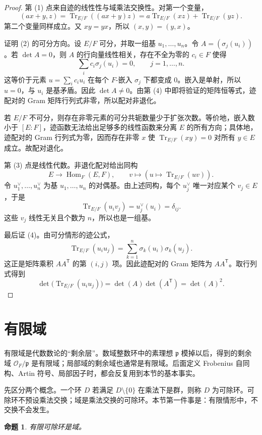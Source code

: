 \documentclass[11pt,a4paper,openany]{ctexbook}
\numberwithin{equation}{chapter}
\newcommand{\Tr}{\operatorname{Tr}}
\newcommand{\Hom}{\operatorname{Hom}}
\theoremstyle{plain}
\newtheorem{proposition}[theorem]{命题}
\theoremstyle{definition}
\theoremstyle{remark}
\begin{document}
\begin{proof}
第 (1) 点来自迹的线性性与域乘法交换性。对第一个变量，
\[
(ax+y,z)=\Tr_{E/F}((ax+y)z)
=a\Tr_{E/F}(xz)+\Tr_{E/F}(yz).
\]
第二个变量同样成立。又 $xy=yx$，所以 $(x,y)=(y,x)$。

证明 (2) 的可分方向。设 $E/F$ 可分，并取一组基 $u_1,\dots,u_n$。令 $A=(\sigma_j(u_i))$。若 $\det A=0$，则 $A$ 的行向量线性相关，存在不全为零的 $c_i\in F$ 使得
\[
\sum_i c_i\sigma_j(u_i)=0,\qquad j=1,\dots,n.
\]
这等价于元素 $u=\sum_i c_i u_i$ 在每个 $F$-嵌入 $\sigma_j$ 下都变成 $0$。嵌入是单射，所以 $u=0$，与 $u_i$ 是基矛盾。因此 $\det A\ne0$。由第 (4) 中即将验证的矩阵恒等式，迹配对的 Gram 矩阵行列式非零，所以配对非退化。

若 $E/F$ 不可分，则存在非零元素的可分共轭数量少于扩张次数。等价地，嵌入数小于 $[E:F]$，迹函数无法给出足够多的线性函数来分离 $E$ 的所有方向；具体地，迹配对的 Gram 行列式为零，因而存在非零 $x$ 使 $\Tr_{E/F}(xy)=0$ 对所有 $y\in E$ 成立。故配对退化。

第 (3) 点是线性代数。非退化配对给出同构
\[
E\longrightarrow \Hom_F(E,F),\qquad
v\longmapsto (u\mapsto \Tr_{E/F}(uv)).
\]
令 $u_1^\vee,\dots,u_n^\vee$ 为基 $u_1,\dots,u_n$ 的对偶基。由上述同构，每个 $u_j^\vee$ 唯一对应某个 $v_j\in E$，于是
\[
\Tr_{E/F}(u_i v_j)=u_j^\vee(u_i)=\delta_{ij}.
\]
这些 $v_j$ 线性无关且个数为 $n$，所以也是一组基。

最后证 (4)。由可分情形的迹公式，
\[
\Tr_{E/F}(u_i u_j)=\sum_{k=1}^n \sigma_k(u_i)\sigma_k(u_j).
\]
这正是矩阵乘积 $AA^{\mathsf T}$ 的第 $(i,j)$ 项。因此迹配对的 Gram 矩阵为 $AA^{\mathsf T}$。取行列式得到
\[
\det\bigl(\Tr_{E/F}(u_i u_j)\bigr)=\det(A)\det(A^{\mathsf T})=\det(A)^2.
\]
\end{proof}

\section{有限域}
有限域是代数数论的“剩余层”。数域整数环中的素理想 $\mathfrak p$ 模掉以后，得到的剩余域 $\mathcal O_F/\mathfrak p$ 是有限域；局部域的剩余域也通常是有限域。后面定义 Frobenius 自同构、Artin 符号、局部因子时，都会反复用到本节的基本事实。

先区分两个概念。一个环 $D$ 若满足 $D\setminus\{0\}$ 在乘法下是群，则称 $D$ 为可除环。可除环不预设乘法交换；域是乘法交换的可除环。本节第一件事是：有限情形中，不交换不会发生。

\begin{proposition}
有限可除环是域。
\end{proposition}
\end{document}
